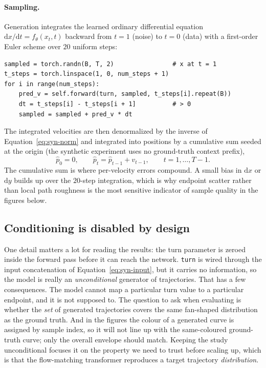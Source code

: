 \paragraph{Sampling.}
Generation integrates the learned ordinary differential equation
$\mathrm{d}x/\mathrm{d}t = f_\theta(x_t,t)$ backward from $t=1$ (noise) to $t=0$
(data) with a first-order Euler scheme over $20$ uniform steps:
\begin{lstlisting}
sampled = torch.randn(B, T, 2)                # x at t = 1
t_steps = torch.linspace(1, 0, num_steps + 1)
for i in range(num_steps):
    pred_v = self.forward(turn, sampled, t_steps[i].repeat(B))
    dt = t_steps[i] - t_steps[i + 1]          # > 0
    sampled = sampled + pred_v * dt
\end{lstlisting}
The integrated velocities are then denormalized by the inverse of
Equation~\eqref{eq:syn-norm} and integrated into positions by a cumulative sum
seeded at the origin (the synthetic experiment uses no ground-truth context
prefix),
\begin{equation}
\hat p_0 = 0,
\qquad
\hat p_{t} = \hat p_{t-1} + v_{t-1},
\qquad t=1,\dots,T-1.
\label{eq:syn-cumsum}
\end{equation}
The cumulative sum is where per-velocity errors compound. A small bias in
$\mathrm{d}x$ or $\mathrm{d}y$ builds up over the $20$-step integration, which is
why endpoint scatter rather than local path roughness is the most sensitive
indicator of sample quality in the figures below.

\subsection{Conditioning is disabled by design}
\label{sec:syn-conditioning}

One detail matters a lot for reading the results: the turn parameter is zeroed
inside the forward pass before it can reach the network. \texttt{turn} is wired
through the input concatenation of Equation~\eqref{eq:syn-input}, but it carries
no information, so the model is really an \emph{unconditional} generator of
trajectories. That has a few consequences. The model cannot map a particular
turn value to a particular endpoint, and it is not supposed to. The question to
ask when evaluating is whether the \emph{set} of generated trajectories covers
the same fan-shaped distribution as the ground truth. And in the figures the
colour of a generated curve is assigned by sample index, so it will not line up
with the same-coloured ground-truth curve; only the overall envelope should
match. Keeping the study unconditional focuses it on the property we need to
trust before scaling up, which is that the flow-matching transformer reproduces a
target trajectory \emph{distribution}.

